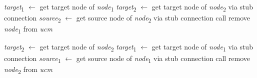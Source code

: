 \begin{algorithm}
\begin{algorithmic}[1]
		 \label{alg:2.11}
			\State \emph{target}\textsubscript{1} $\gets$ get target node of \emph{node}\textsubscript{1}
			\State \emph{target}\textsubscript{2} $\gets$ get target node of \emph{node}\textsubscript{2} via stub connection
			\State \emph{source}\textsubscript{2} $\gets$ get source node of \emph{node}\textsubscript{2} via stub connection
			\State call 
			\State remove \emph{node}\textsubscript{1} from \emph{ucm}
		\EndFunction \label{alg:2.12}
		
		 \label{alg:2.13}
			\State \emph{target}\textsubscript{2} $\gets$ get target node of \emph{node}\textsubscript{2}
			\State \emph{target}\textsubscript{1} $\gets$ get target node of \emph{node}\textsubscript{1} via stub connection
			\State \emph{source}\textsubscript{1} $\gets$ get source node of \emph{node}\textsubscript{1} via stub connection
			\State call 
			\State remove \emph{node}\textsubscript{2} from \emph{ucm}
		\EndFunction \label{alg:2.14}
		
	\end{algorithmic}
\end{algorithm}

